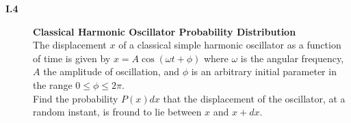 \documentclass[11pt]{article}
\begin{document}
\begin{description}
\item[{\bf I.4} ] 
{\bf Classical Harmonic Oscillator Probability Distribution} \\
The displacement $x$ of a classical simple harmonic oscillator as a function of time
is given by $x = A\cos(\omega t+\phi)$
where $\omega$ is the angular frequency, $A$ the amplitude of oscillation,
and $\phi$ is an arbitrary initial parameter in the range $0\le \phi\le 2\pi$.\\
Find the probability $P(x)dx$ that the displacement of the 
oscillator, at a random instant, is fround to lie 
between $x$ and $x + dx$.



\end{description}
\end{document}
